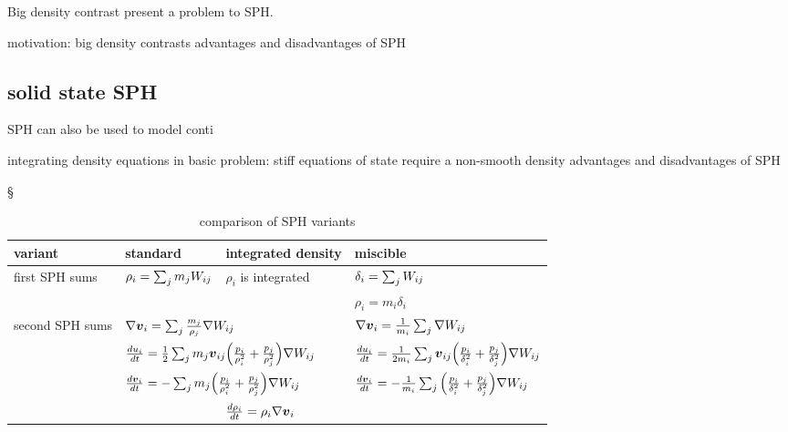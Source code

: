 %




Big density contrast present a problem to SPH. 

motivation: big density contrasts
advantages and disadvantages of SPH


\subsection{solid state SPH}
SPH can also be used to model conti

\citep{Nyffeler2004}
integrating density
equations in 
basic problem: stiff equations of state require a non-smooth density 
advantages and disadvantages of SPH

§

\begin{table}[htdp]
\begin{center}
\begin{tabular}{|l|l|l|l|}
\hline
variant & standard  & integrated density & miscible \\
\hline \hline
\multirow{2}{3cm}{first SPH sums} & 
\multirow{2}{3cm}{$\rho_i = \sum_{j} m_j W_{ij} $} & 
\multirow{2}{3cm}{$\rho_i$ is integrated }  & 
$ \delta_i = \sum_{j} W_{ij}$ \\
 &
 &
 & 
$\rho_i = m_i \delta_i $ \\
\hline
\multirow{4}{3cm}{second SPH sums} &
\multicolumn{2}{|l|}{$ \nabla \boldsymbol{v}_i = \sum_{j} \frac{m_j}{\rho_j} \nabla W_{ij} $} & 
$ \nabla \boldsymbol{v}_i = \frac{1}{m_i} \sum_{j} \nabla W_{ij} $ \\
& 
\multicolumn{2}{|l|}{$ \frac{du_i}{dt} = \frac{1}{2} \sum_{j} m_{j} \boldsymbol{v}_{ij} \Big( \frac{p_i}{\rho_i^2}  + \frac{p_j}{\rho_j^2} \Big) \nabla W_{ij} $} & 
$ \frac{du_i}{dt} = \frac{1}{2 m_i} \sum_{j} \boldsymbol{v}_{ij} \Big( \frac{p_i}{\delta_i^2}  + \frac{p_j}{\delta_j^2} \Big)  \nabla W_{ij} $ \\
& 
\multicolumn{2}{|l|}{$\frac{d \boldsymbol{v}_i }{dt} = - \sum_{j} m_j \Big( \frac{p_i}{\rho_i^2} + \frac{p_j}{\rho_j^2} \Big) \nabla W_{ij}$} & 
$\frac{d \boldsymbol{v}_i }{dt} = - \frac{1}{m_i} \sum_{j} \Big( \frac{p_i}{\delta_i^2} + \frac{p_j}{\delta_j^2} \Big) \nabla W_{ij}$\\
&   
& 
$\frac{d \rho_i}{dt} = \rho_i \nabla \boldsymbol{v}_i$ &
\\
\hline

\hline
\end{tabular}
\caption{comparison of SPH variants}
\end{center}
\label{default}
\end{table}


